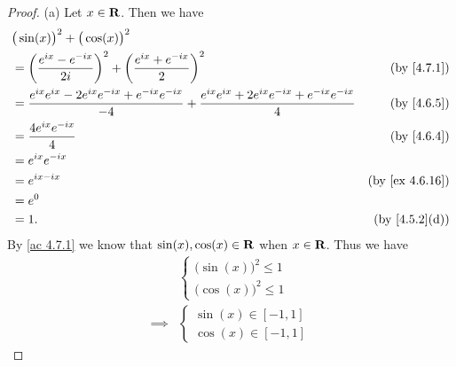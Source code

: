 \begin{proof}{(a)}
  Let \(x \in \mathbf{R}\).
  Then we have
  \begin{align*}
     & \big(\sin(x)\big)^2 + \big(\cos(x)\big)^2                                                                                                                                       \\
     & = \bigg(\frac{e^{i x} - e^{- i x}}{2i}\bigg)^2 + \bigg(\frac{e^{i x} + e^{- i x}}{2}\bigg)^2                                                     & \text{(by \cref{4.7.1})}     \\
     & = \frac{e^{i x} e^{i x} - 2 e^{i x} e^{- i x} + e^{- i x} e^{- i x}}{-4} + \frac{e^{i x} e^{i x} + 2 e^{i x} e^{- i x} + e^{- i x} e^{- i x}}{4} & \text{(by \cref{4.6.5})}     \\
     & = \frac{4 e^{i x} e^{- i x}}{4}                                                                                                                  & \text{(by \cref{4.6.4})}     \\
     & = e^{i x} e^{- i x}                                                                                                                                                             \\
     & = e^{i x - i x}                                                                                                                                  & \text{(by \cref{ex 4.6.16})} \\
     & = e^0                                                                                                                                                                           \\
     & = 1.                                                                                                                                             & \text{(by \cref{4.5.2}(d))}
  \end{align*}
  By \cref{ac 4.7.1} we know that \(\sin(x), \cos(x) \in \mathbf{R}\) when \(x \in \mathbf{R}\).
  Thus we have
  \begin{align*}
             & \begin{cases}
                 \big(\sin(x)\big)^2 \leq 1 \\
                 \big(\cos(x)\big)^2 \leq 1
               \end{cases} \\
    \implies & \begin{cases}
                 \sin(x) \in [-1, 1] \\
                 \cos(x) \in [-1, 1]
               \end{cases}
  \end{align*}
\end{proof}

